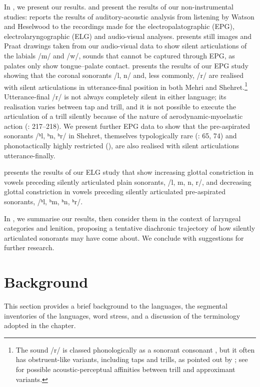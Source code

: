 \documentclass[output=paper]{langscibook}
\begin{document}
In , we present our results.  and  present the results of our non-instrumental studies:  reports the results of auditory-acoustic analysis from listening by Watson and Heselwood to the recordings made for the electropalatographic (EPG), electrolaryngographic (ELG) and audio-visual analyses.  presents still images and Praat drawings taken from our audio-visual data to show silent articulations of the labials \mbox{/m/} and \mbox{/w/}, sounds that cannot be captured through EPG, as palates only show tongue–palate contact.  presents the results of our EPG study showing that the coronal sonorants /l, n/ and, less commonly, \mbox{/r/} are realised with silent articulations in utterance-final position in both Mehri and Shehret.\footnote{The sound \mbox{/r/} is classed phonologically as a sonorant consonant \citep[36]{Kenstowicz1994}, but it often has obstruent-like variants, including taps and trills, as pointed out by \citet{Lindau1980}; see \citet{HowsonMonahan2019} for possible acoustic-perceptual affinities between trill and approximant variants.}  Utterance-final \mbox{/r/} is not always completely silent in either language; its realisation varies between tap and trill, and it is not possible to execute the articulation of a trill silently because of the nature of aerodynamic-myoelastic action (\citealt{LadefogedMaddieson1996}: 217–218). We present further EPG data to show that the pre-aspirated sonorants /ʰl, ʰn, ʰr/ in Shehret, themselves typologically rare (\citealt{Maddieson1984}: 65, 74) and phonotactically highly restricted (\citealt{Berkson2016,Berkson2019}), are also realised with silent articulations utterance-finally.

 presents the results of our ELG study that show increasing glottal constriction in vowels preceding silently articulated plain sonorants, /l, m, n, r/, and decreasing glottal constriction in vowels preceding silently articulated pre-aspirated sonorants, /ʰl, ʰm, ʰn, ʰr/.

In , we summarise our results, then consider them in the context of laryngeal categories and lenition, proposing a tentative diachronic trajectory of how silently articulated sonorants may have come about. We conclude with suggestions for further research.

\section{Background} %
\label{sec:watson:2}
This section provides a brief background to the languages, the segmental inventories of the languages, word stress, and a discussion of the terminology adopted in the chapter.
\end{document}
